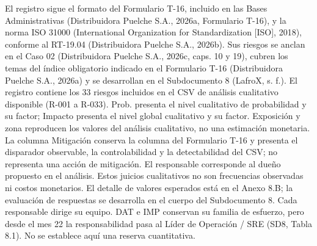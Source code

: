 \documentclass[carta,firma,sinnotas]{lafrox}
\begin{document}
\portadalafrox
\preliminareslafrox
\setcounter{chapter}{7}


El registro sigue el formato del Formulario T-16, incluido en las Bases Administrativas (Distribuidora Puelche S.A., 2026a, Formulario T-16), y la norma ISO 31000 (International Organization for Standardization [ISO], 2018), conforme al RT-19.04 (Distribuidora Puelche S.A., 2026b). Sus riesgos se anclan en el Caso 02 (Distribuidora Puelche S.A., 2026c, caps. 10 y 19), cubren los temas del índice obligatorio indicado en el Formulario T-16 (Distribuidora Puelche S.A., 2026a) y se desarrollan en el Subdocumento 8 (LafroX, s. f.). El registro contiene los 33 riesgos incluidos en el CSV de análisis cualitativo disponible (R-001 a R-033). Prob. presenta el nivel cualitativo de probabilidad y su factor; Impacto presenta el nivel global cualitativo y su factor. Exposición y zona reproducen los valores del análisis cualitativo, no una estimación monetaria. La columna Mitigación conserva la columna del Formulario T-16 y presenta el disparador observable, la controlabilidad y la detectabilidad del CSV; no representa una acción de mitigación. El responsable corresponde al dueño propuesto en el análisis. Estos juicios cualitativos no son frecuencias observadas ni costos monetarios. El detalle de valores esperados está en el Anexo 8.B; la evaluación de respuestas se desarrolla en el cuerpo del Subdocumento 8. Cada responsable dirige su equipo. DAT e IMP conservan su familia de esfuerzo, pero desde el mes 22 la responsabilidad pasa al Líder de Operación / SRE (SD8, Tabla 8.1). No se establece aquí una reserva cuantitativa.
\end{document}
